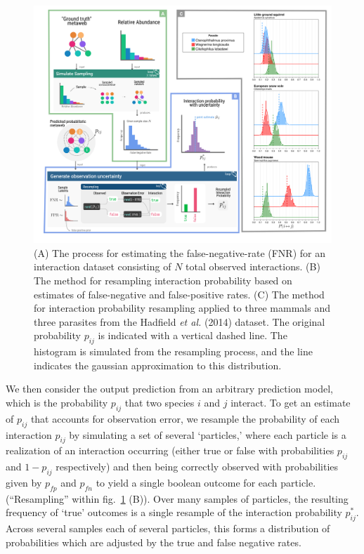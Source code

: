 \documentclass[11pt]{article}
\makeatletter
\def\maxwidth{\ifdim\Gin@nat@width>\linewidth\linewidth
\else\Gin@nat@width\fi}
\let\Oldincludegraphics\includegraphics
\renewcommand{\includegraphics}[1]{\Oldincludegraphics[width=\maxwidth]{#1}}
\makeatother
\begin{document}
\begin{figure}
\hypertarget{fig:resampling_concept}{%
\centering
\includegraphics{./figures/uncertainty_sampler.png}
\caption{(A) The process for estimating the false-negative-rate (FNR)
for an interaction dataset consisting of \(N\) total observed
interactions. (B) The method for resampling interaction probability
based on estimates of false-negative and false-positive rates. (C) The
method for interaction probability resampling applied to three mammals
and three parasites from the Hadfield \emph{et al.} (2014) dataset. The
original probability \(p_{ij}\) is indicated with a vertical dashed
line. The histogram is simulated from the resampling process, and the
line indicates the gaussian approximation to this
distribution.}\label{fig:resampling_concept}
}
\end{figure}

We then consider the output prediction from an arbitrary prediction
model, which is the probability \(p_{ij}\) that two species \(i\) and
\(j\) interact. To get an estimate of \(p_{ij}\) that accounts for
observation error, we resample the probability of each interaction
\(p_{ij}\) by simulating a set of several `particles,' where each
particle is a realization of an interaction occurring (either true or
false with probabilities \(p_{ij}\) and \(1-p_{ij}\) respectively) and
then being correctly observed with probabilities given by \(p_{fp}\) and
\(p_{fn}\) to yield a single boolean outcome for each particle.
(``Resampling'' within fig.~\ref{fig:resampling_concept} (B)). Over many
samples of particles, the resulting frequency of `true' outcomes is a
single resample of the interaction probability \(p_{ij}^*\). Across
several samples each of several particles, this forms a distribution of
probabilities which are adjusted by the true and false negative rates.
\end{document}
